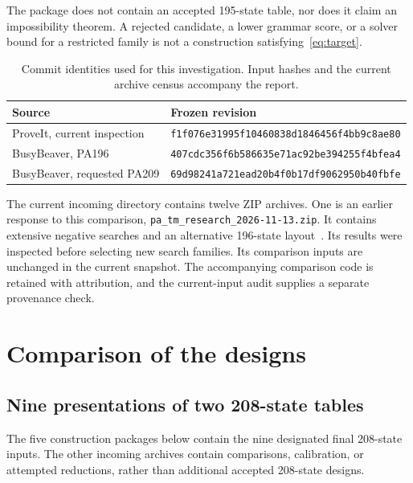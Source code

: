 \documentclass[11pt,letterpaper]{article}
\newcommand{\file}[1]{\texttt{\nolinkurl{#1}}}
\begin{document}
The package does not contain an accepted 195-state table, nor does it
claim an impossibility theorem. A rejected candidate, a lower grammar
score, or a solver bound for a restricted family is not a construction
satisfying~\eqref{eq:target}.

\begin{table}[ht]
\centering\small
\begin{tabular}{@{}p{.25\linewidth}p{.68\linewidth}@{}}
\toprule
Source & Frozen revision\\
\midrule
ProveIt, current inspection & \file{f1f076e31995f10460838d1846456f4bb9c8ae80}\\
BusyBeaver, PA196 & \file{407cdc356f6b586635e71ac92be394255f4bfea4}\\
BusyBeaver, requested PA209 & \file{69d98241a721ead20b4f0b17df9062950b40fbfe}\\
\bottomrule
\end{tabular}
\caption{Commit identities used for this investigation. Input hashes and
the current archive census accompany the report.}
\end{table}

The current incoming directory contains twelve ZIP archives. One is an
earlier response to this comparison, \file{pa_tm_research_2026-11-13.zip}.
It contains extensive negative searches and an alternative 196-state
layout~\cite{prior}. Its results were inspected before selecting new
search families. Its comparison inputs are unchanged in the current
snapshot. The accompanying comparison code is retained with attribution,
and the current-input audit supplies a separate provenance check.

\section{Comparison of the designs}
\label{sec:comparison}

\subsection{Nine presentations of two 208-state tables}

The five construction packages below contain the nine designated final
208-state inputs. The other incoming archives contain comparisons,
calibration, or attempted reductions, rather than additional accepted
208-state designs.
\end{document}
